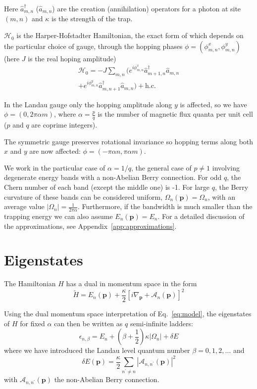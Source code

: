 \documentclass[twocolumn, 10pt, aps, superscriptaddress, floatfix, showpacs, pra, citeautoscript]{revtex4-1}
\newcommand{\vt}[1]{\mathbf{#1}}
\begin{document}
Here $\hat{a}_{m,n}^{\dagger}$ ($\hat{a}_{m,n}$) are the creation
(annihilation) operators for a photon at site $(m,n)$ and $\kappa$ is the
strength of the trap.

$\mathcal{H}_0$ is the Harper-Hofstadter Hamiltonian, the exact form
of which depends on the particular choice of gauge, through the
hopping phases $\phi = (\phi_{m,n}^x, \phi_{m,n}^y)$ (here $J$ is the real hoping
amplitude)
%
\begin{multline}\label{eq:hh_hamiltonian}
\mathcal{H}_0=-J\sum_{m,n}(e^{i \phi_{m,n}^x}\hat{a}_{m+1,n}^{\dagger}\hat{a}_{m,n}\\
+e^{i \phi_{m,n}^y}\hat{a}_{m,n+1}^{\dagger}\hat{a}_{m,n}) + \text{h.c.}
\end{multline}

In the Landau gauge only the hopping amplitude along $y$ is affected,
so we have $\phi = (0, 2\pi\alpha m)$, where $\alpha = \frac{p}{q}$ is
the number of magnetic flux quanta per unit cell ($p$ and $q$ are
coprime integers).


The symmetric gauge preserves rotational invariance so hopping terms
along both $x$ and $y$ are now affected:
$\phi = (-\pi\alpha n, \pi\alpha m)$.


We work in the particular case of $\alpha=1/q$, the general case of
$p \neq 1$ involving degenerate energy bands with a non-Abelian Berry
connection.  For odd $q$, the Chern number of each band (except the
middle one) is -1. For large $q$, the Berry curvature of these bands
can be considered uniform, $\Omega_n(\vt{p}) = \Omega_n$, with an
average value $|\Omega_n| = \frac{1}{2\pi\alpha}$. Furthermore, if the
bandwidth is much smaller than the trapping energy we can also assume
$E_n(\vt{p}) = E_n$. For a detailed discussion of the approximations,
see Appendix~\ref{app:approximations}.


\section{Eigenstates}\label{sec:eigenstates}
The Hamiltonian $H$ has a dual in momentum space in the form
\begin{equation}
  \widetilde{H} = E_n(\mathbf{p}) + \frac{\kappa}{2} [i\nabla_{\mathbf{p}} + \mathcal{A}_n(\mathbf{p})]^2
\end{equation}

Using the dual momentum space interpretation of Eq.~\eqref{eq:model},
the eigenstates of $H$ for fixed $\alpha$ can then be written
as $q$ semi-infinite ladders:~\cite{price2014magnetic}
%
\begin{equation}\label{eq:ladders}
  \epsilon_{n,\beta} = E_n + \left(\beta + \frac{1}{2}\right) \kappa |\Omega_n| + \delta E
\end{equation}
where we have introduced the Landau level quantum number
$\beta = 0,1,2,\dots$ and
\begin{equation}
  \delta E(\mathbf{p}) = \frac{\kappa}{2} \sum_{n^{\prime} \neq n} |\mathcal{A}_{n,n^{\prime}}(\mathbf{p})|^2
\end{equation}
with $\mathcal{A}_{n,n^{\prime}}(\mathbf{p})$ the non-Abelian Berry connection.
\end{document}
